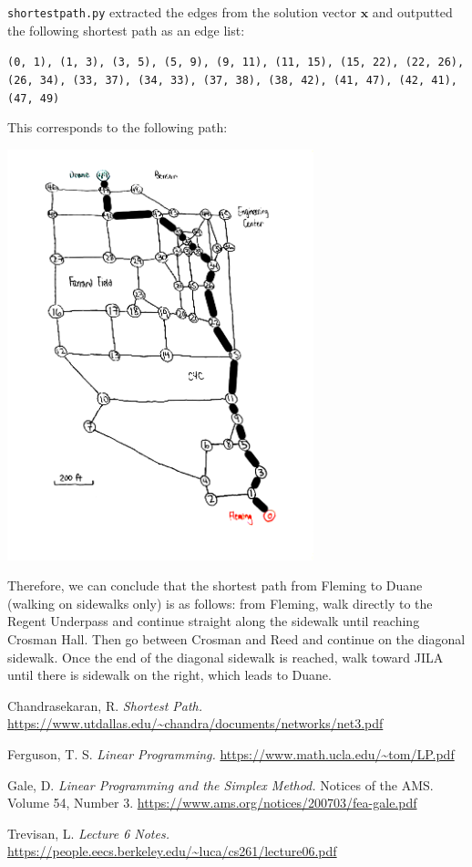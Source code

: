 \texttt{shortestpath.py} extracted the edges from the solution vector $\mathbf{x}$ and outputted the following shortest path as an edge list:

\small{\texttt{(0, 1), (1, 3), (3, 5), (5, 9), (9, 11), (11, 15), (15, 22), (22, 26), (26, 34), (33, 37), (34, 33), (37, 38), (38, 42), (41, 47), (42, 41), (47, 49)}}

This corresponds to the following path:

\begin{center}
    \includegraphics[width=3.5in]{map_sp}
\end{center}

Therefore, we can conclude that the shortest path from Fleming to Duane (walking on sidewalks only) is as follows: from Fleming, walk directly to the Regent Underpass and continue straight along the sidewalk until reaching Crosman Hall. Then go between Crosman and Reed and continue on the diagonal sidewalk. Once the end of the diagonal sidewalk is reached, walk toward JILA until there is sidewalk on the right, which leads to Duane.

\begin{thebibliography}{9}

Chandrasekaran, R. 
\textit{Shortest Path.} 
\url{https://www.utdallas.edu/~chandra/documents/networks/net3.pdf}

Ferguson, T. S.
\textit{Linear Programming.}
\url{https://www.math.ucla.edu/~tom/LP.pdf}

Gale, D.
\textit{Linear Programming and the Simplex Method.}
Notices of the AMS. 
Volume 54, Number 3.
\url{https://www.ams.org/notices/200703/fea-gale.pdf}

Trevisan, L.
\textit{Lecture 6 Notes.}
\url{https://people.eecs.berkeley.edu/~luca/cs261/lecture06.pdf}

\end{thebibliography}

